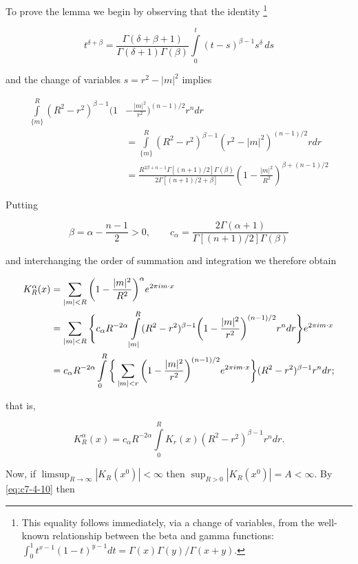 To prove the lemma we begin by observing that the identity \footnote{This equality follows immediately, via a change of variables, from the well-known relationship between the beta and gamma functions: $\int_0^1 t^{x-1}(1 - t)^{y-1} dt = \Gamma(x) \Gamma(y) / \Gamma(x + y)$.}

\[
t^{\delta+\beta}=\frac{\Gamma(\delta+\beta+1)}{\Gamma(\delta+1)\Gamma(\beta)}\int\limits_{0}^{t}(t-s)^{\beta-1}s^{\delta}\,d s
\]

and the change of variables $s = r^{2} - |m|^{2}$ implies

\[
\begin{aligned}\int\limits_{\{m\}}^{R}(R^{2}-r^{2})^{\beta-1}\bigg(1&-\frac{|m|^{2}}{r^{2}}\bigg)^{(n-1)/2}r^{n} dr\\&=\int\limits_{\{m\}}^{R}(R^{2}-r^{2})^{\beta-1}(r^{2}-|m|^{2})^{(n-1)/2}r dr\\&=\frac{R^{2\beta+n-1}\Gamma[(n+1)/2]\Gamma(\beta)}{2\Gamma[(n+1)/2+\beta]}\left(1-\frac{|m|^{2}}{R^{2}}\right)^{\beta+(n-1)/2}\end{aligned}
\]

Putting

\[
\beta=\alpha-\frac{n-1}{2}>0,\qquad c_{\alpha}=\frac{2\Gamma(\alpha+1)}{\Gamma[(n+1)/2]\Gamma(\beta)}
\]

and interchanging the order of summation and integration we therefore obtain

\[
\begin{aligned}{K_{R}^{\alpha}(x)}&{{}=\sum_{|m|<R}\bigg(1-\frac{|m|^{2}}{R^{2}}\bigg)^{\alpha}e^{2\pi i m\cdot x}}\\ {}&{{}=\sum_{|m|<R}\Bigg\{c_{\alpha}R^{-2\alpha}\intop_{|m|}^{R}(R^{2}-r^{2})^{\beta-1}\bigg(1-\frac{|m|^{2}}{r^{2}}\bigg)^{(n-1)/2}r^{n}d r\Bigg\}e^{2\pi i m\cdot x}}\\ {}&{{}=c_{\alpha}R^{-2\alpha}\intop_{0}^{R}\bigg\{\sum_{|m|<r}\bigg(1-\frac{|m|^{2}}{r^{2}}\bigg)^{(n-1)/2}e^{2\pi i m\cdot x}\bigg\}(R^{2}-r^{2})^{\beta-1}r^{n}d r;}\\ \end{aligned}
\]

that is,

\begin{equation}\label{eq:c7-4-10}
K_{R}^{\alpha}(x)=c_{\alpha}R^{-2\alpha}\int\limits_{0}^{R}K_{r}(x)(R^{2}-r^{2})^{\beta-1}r^{n}d r.
\end{equation}

Now, if $\limsup_{R \to \infty} |K_R(x^0)| < \infty$ then $\sup_{R > 0} |K_R(x^0)| = A < \infty$. By \eqref{eq:c7-4-10} then

